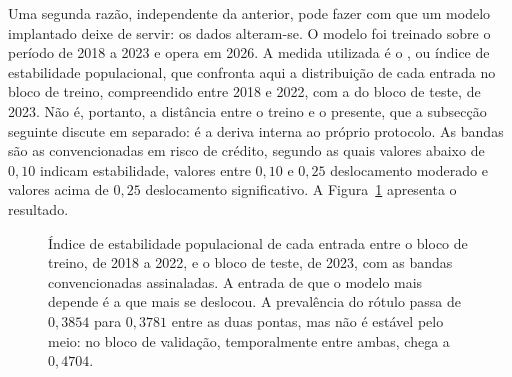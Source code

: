 Uma segunda razão, independente da anterior, pode fazer com que um modelo implantado deixe de servir:
os dados alteram-se. O modelo foi treinado sobre o período de 2018 a 2023 e opera em 2026. A medida
utilizada é o , ou índice de estabilidade populacional, que confronta aqui a
distribuição de cada entrada no bloco de treino,
compreendido entre 2018 e 2022, com a do bloco de teste, de 2023. Não é, portanto, a distância entre
o treino e o presente, que a subsecção seguinte discute em separado: é a deriva interna ao próprio
protocolo. As bandas são as convencionadas em risco de crédito, segundo as quais valores
abaixo de $0{,}10$
indicam estabilidade, valores entre $0{,}10$ e $0{,}25$ deslocamento moderado e valores acima de
$0{,}25$ deslocamento significativo. A Figura~\ref{fig:av_deriva} apresenta o resultado.

\begin{figure}[htbp]
\centering
{}
\caption[Deslocamento das distribuições de entrada]{Índice de estabilidade populacional de cada
entrada entre o bloco de treino, de 2018 a 2022, e o bloco de teste, de 2023, com as bandas
convencionadas assinaladas. A entrada de que o modelo mais depende é a que mais se deslocou. A
prevalência do rótulo passa de $0{,}3854$ para $0{,}3781$ entre as duas pontas, mas não é estável
pelo meio: no bloco de validação, temporalmente entre ambas, chega a $0{,}4704$.}
\label{fig:av_deriva}
\end{figure}


